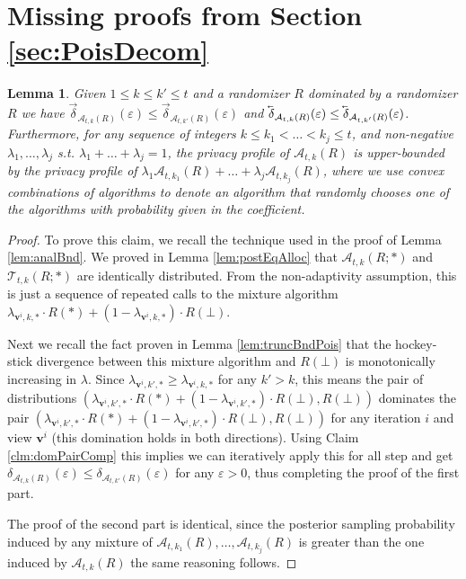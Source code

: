 \documentclass{article}
\theoremstyle{plain}
\newtheorem{lemma}[theorem]{Lemma}
\theoremstyle{definition}
\newcommand{\eps}{\varepsilon}
\newcommand{\lvec}[1]{\reflectbox{$\vec{\reflectbox{$#1$}}$}}
\newcommand{\rand}{R}
\newcommand{\view}{\boldsymbol{v}}
\newcommand{\alloc}[2]{\mathcal{A}_{#1}\left(#2\right)}
\newcommand{\allocFunc}[3]{\mathcal{A}_{#1}\left(#2; #3\right)}
\newcommand{\postFunc}[3]{\mathcal{T}_{#1}\left(#2; #3\right)}
\newcommand{\add}[1]{\lvec{#1}}
\newcommand{\rem}[1]{\vec{#1}}
\newcommand{\privProf}[1]{\delta_{#1}}
\newcommand{\privProfAdd}[1]{\add{\delta}_{#1}}
\newcommand{\privProfRem}[1]{\rem{\delta}_{#1}}
\begin{document}
\section{Missing proofs from Section \ref{sec:PoisDecom}} \label{apd:PoisDecom}
\begin{lemma}\label{lem:allocMontn}
        Given $1 \le k \le k' \le t$ and a randomizer $\rand$ dominated by a randomizer $\rand$ we have $\privProfRem{\alloc{t, k}{\rand}}(\eps) \le \privProfRem{\alloc{t, k'}{\rand}}(\eps)$ and $\privProfAdd{\alloc{t, k}{\rand}}(\eps) \le \privProfAdd{\alloc{t, k'}{\rand}}(\eps)$. Furthermore, for any sequence of integers $k \le k_{1} < \ldots < k_{j} \le t$, and non-negative $\lambda_{1}, \ldots, \lambda_{j}$ s.t. $\lambda_{1} + \ldots + \lambda_{j} = 1$, the privacy profile of $\alloc{t, k}{\rand}$ is upper-bounded by the privacy profile of $\lambda_{1} \alloc{t, k_{1}}{\rand} + \ldots + \lambda_{j} \alloc{t, k_{j}}{\rand}$, where we use convex combinations of algorithms to denote an algorithm that randomly chooses one of the algorithms with probability given in the coefficient.
\end{lemma}

\begin{proof}
    To prove this claim, we recall the technique used in the proof of Lemma \ref{lem:analBnd}. We proved in Lemma \ref{lem:postEqAlloc} that $\allocFunc{t, k}{\rand}{*}$ and $\postFunc{t, k}{\rand}{*}$ are identically distributed. From the non-adaptivity assumption, this is just a sequence of repeated calls to the mixture algorithm $\lambda_{\view^{i}, k, *} \cdot \rand(*) + (1-\lambda_{\view^{i}, k, *}) \cdot \rand(\bot)$.
    
    Next we recall the fact proven in Lemma \ref{lem:truncBndPois} that the hockey-stick divergence between this mixture algorithm and $\rand(\bot)$ is monotonically increasing in $\lambda$. Since $\lambda_{\view^{i}, k', *} \ge \lambda_{\view^{i}, k, *}$ for any $k' > k$, this means the pair of distributions $(\lambda_{\view^{i}, k', *} \cdot \rand(*) + (1-\lambda_{\view^{i}, k', *}) \cdot \rand(\bot), \rand(\bot))$ dominates the pair $(\lambda_{\view^{i}, k', *} \cdot \rand(*) + (1-\lambda_{\view^{i}, k', *}) \cdot \rand(\bot), \rand(\bot))$ for any iteration $i$ and view $\view^{i}$ (this domination holds in both directions). Using Claim \ref{clm:domPairComp} this implies we can iteratively apply this for all step and get $\privProf{\alloc{t, k}{\rand}}(\eps) \le \privProf{\alloc{t, k'}{\rand}}(\eps)$ for any $\eps > 0$, thus completing the proof of the first part.

    The proof of the second part is identical, since the posterior sampling probability induced by any mixture of $\alloc{t, k_{1}}{\rand},  \ldots, \alloc{t, k_{j}}{\rand}$ is greater than the one induced by $\alloc{t, k}{\rand}$ the same reasoning follows.
\end{proof}
\end{document}
